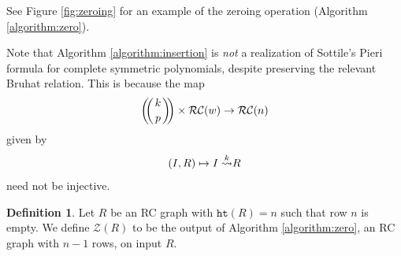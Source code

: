 \documentclass{amsart}
\theoremstyle{definition}
\newtheorem{definition}[lemma]{Definition}
\theoremstyle{remark}
\numberwithin{equation}{subsection}
\newcommand{\zeromap}{\mathcal{Z}}
\newcommand{\hr}{\mathtt{ht}}
\newcommand{\RC}{\mathcal{RC}}
\begin{document}
See Figure \ref{fig:zeroing} for an example of the zeroing operation (Algorithm \ref{algorithm:zero}). 

\def\multiset#1#2{\ensuremath{\left(\kern-.3em\left(\genfrac{}{}{0pt}{}{#1}{#2}\right)\kern-.3em\right)}}


Note that Algorithm \ref{algorithm:insertion} is \emph{not} a realization of Sottile's Pieri formula for complete symmetric polynomials, despite preserving the relevant Bruhat relation. This is because the map 
$$\multiset{k}{p}\times\RC(w)\to \RC(n)$$
given by 
$$(I, R)\mapsto \ins{k}{I} R$$ 
need not be injective.

\begin{definition}\label{definition:zeromap}
Let $R$ be an RC graph with $\hr(R) = n$ such that row $n$ is empty. We define $\zeromap(R)$ to be the output of Algorithm \ref{algorithm:zero}, an RC graph with $n-1$ rows, on input $R$.
\end{definition}
\end{document}

